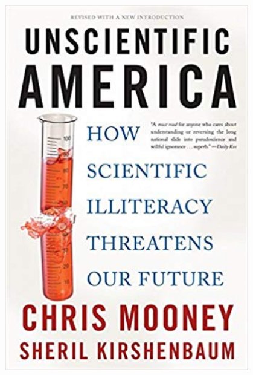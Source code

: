 \documentclass[10pt]{beamer}
\begin{document}
\begin{frame}[t]
\begin{columns}
			\begin{column}{0.4\textwidth}
				\begin{center}
					\includegraphics[width=0.8\textwidth]{figures/mooney.jpg}
				\end{center}
			\end{column}
		\end{columns}
\end{frame}
\end{document}
